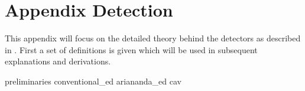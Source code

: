\documentclass[a4paper, openany, oneside]{memoir}
\begin{document}
\section{Appendix Detection}\label{app:detector}
This appendix will focus on the detailed theory behind the detectors as described in . First a set of definitions is given which will be
used in subsequent explanations and derivations.

{preliminaries}
{conventional_ed}
{ariananda_ed}
{cav}
\end{document}
